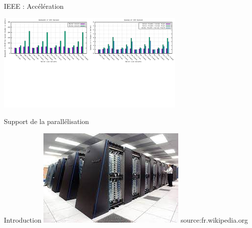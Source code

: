 \documentclass{beamer}
\begin{document}
\begin{frame}{IEEE : Accélération}
   

 \centering\includegraphics[width=350px]{../ressources/vm_ieee.png}
    
    
\end{frame}
\begin{frame}{Support de la parallélisation}

  \begin{block}{Introduction}
    \includegraphics[width=0.6\linewidth]{../ressources/index.jpeg}
    source:fr.wikipedia.org
  \end{block}

\end{frame}
\end{document}

